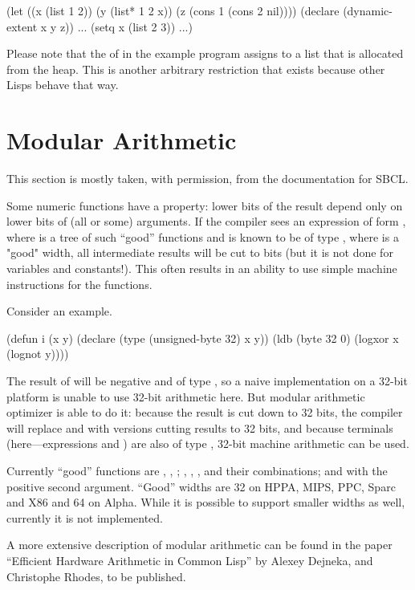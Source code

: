 \begin{lisp}
(let ((x (list 1 2))
      (y (list* 1 2 x))
      (z (cons 1 (cons 2 nil))))
  (declare (dynamic-extent x y z))
  ...
  (setq x (list 2 3))
  ...)
\end{lisp}

Please note that the  of  in the example program
assigns to  a list that is allocated from the heap.  This is
another arbitrary restriction that exists because other Lisps behave
that way.

\section{Modular Arithmetic}

This section is mostly taken, with permission,  from the documentation
for SBCL.

Some numeric functions have a property:  lower bits of
the result depend only on  lower bits of (all or some)
arguments. If the compiler sees an expression of form , where  is a tree of such ``good'' functions
and  is known to be of type , where  is a "good" width, all intermediate results
will be cut to  bits (but it is not done for variables
and constants!). This often results in an ability to use simple
machine instructions for the functions.

Consider an example.
\begin{lisp}
(defun i (x y)
  (declare (type (unsigned-byte 32) x y))
  (ldb (byte 32 0) (logxor x (lognot y))))
\end{lisp}
The result of  will be negative and of
type , so a naive implementation on a 32-bit
platform is unable to use 32-bit arithmetic here. But modular
arithmetic optimizer is able to do it: because the result is cut down
to 32 bits, the compiler will replace 
and  with versions cutting results to 32 bits, and
because terminals (here---expressions  and )
are also of type , 32-bit machine
arithmetic can be used.


Currently ``good'' functions
are \code{+}, \code{-}, \code{*}; , ,
,  and their combinations;
and  with the positive second argument. ``Good'' widths
are 32 on HPPA, MIPS, PPC, Sparc and X86 and 64 on Alpha. While it is
possible to support smaller widths as well, currently it is not
implemented.

A more extensive description of modular arithmetic can be found in the
paper ``Efficient Hardware Arithmetic in Common Lisp'' by Alexey
Dejneka, and Christophe Rhodes, to be published.
